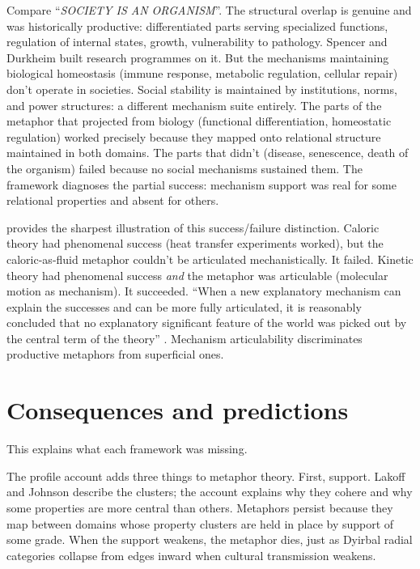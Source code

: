 \documentclass[12pt]{article}
\newcommand{\metaphor}[1]{\enquote{\textit{\MakeUppercase{#1}}}}
\begin{document}
Compare \metaphor{society is an organism}. The structural overlap is genuine and was historically productive: differentiated parts serving specialized functions, regulation of internal states, growth, vulnerability to pathology. Spencer and Durkheim built research programmes on it. But the mechanisms maintaining biological homeostasis (immune response, metabolic regulation, cellular repair) don't operate in societies. Social stability is maintained by institutions, norms, and power structures: a different mechanism suite entirely. The parts of the metaphor that projected from biology (functional differentiation, homeostatic regulation) worked precisely because they mapped onto relational structure maintained in both domains. The parts that didn't (disease, senescence, death of the organism) failed because no social mechanisms sustained them. The framework diagnoses the partial success: mechanism support was real for some relational properties and absent for others.

\textcite{cummiskey1992} provides the sharpest illustration of this success/failure distinction. Caloric theory had phenomenal success (heat transfer experiments worked), but the caloric-as-fluid metaphor couldn't be articulated mechanistically. It failed. Kinetic theory had phenomenal success \emph{and} the metaphor was articulable (molecular motion as mechanism). It succeeded. \enquote{When a new explanatory mechanism can explain the successes and can be more fully articulated, it is reasonably concluded that no explanatory significant feature of the world was picked out by the central term of the theory} \citep[35]{cummiskey1992}. Mechanism articulability discriminates productive metaphors from superficial ones.

\section{Consequences and predictions}
\label{sec:consequences}

This explains what each framework was missing.

The profile account adds three things to metaphor theory. First, support. Lakoff and Johnson describe the clusters; the account explains why they cohere and why some properties are more central than others. Metaphors persist because they map between domains whose property clusters are held in place by support of some grade. When the support weakens, the metaphor dies, just as Dyirbal radial categories collapse from edges inward when cultural transmission weakens.
\end{document}
